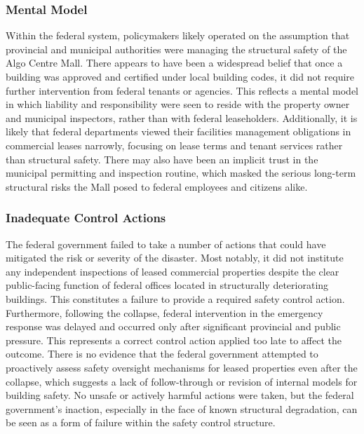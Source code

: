 \documentclass[12pt]{article}
\begin{document}
\subsubsection*{Mental Model}
Within the federal system, policymakers likely operated on the assumption that provincial and municipal authorities were managing the structural safety of the Algo Centre Mall. There appears to have been a widespread belief that once a building was approved and certified under local building codes, it did not require further intervention from federal tenants or agencies. This reflects a mental model in which liability and responsibility were seen to reside with the property owner and municipal inspectors, rather than with federal leaseholders. Additionally, it is likely that federal departments viewed their facilities management obligations in commercial leases narrowly, focusing on lease terms and tenant services rather than structural safety. There may also have been an implicit trust in the municipal permitting and inspection routine, which masked the serious long-term structural risks the Mall posed to federal employees and citizens alike.

\subsubsection*{Inadequate Control Actions}
The federal government failed to take a number of actions that could have mitigated the risk or severity of the disaster. Most notably, it did not institute any independent inspections of leased commercial properties despite the clear public-facing function of federal offices located in structurally deteriorating buildings. This constitutes a failure to provide a required safety control action. Furthermore, following the collapse, federal intervention in the emergency response was delayed and occurred only after significant provincial and public pressure. This represents a correct control action applied too late to affect the outcome. There is no evidence that the federal government attempted to proactively assess safety oversight mechanisms for leased properties even after the collapse, which suggests a lack of follow-through or revision of internal models for building safety. No unsafe or actively harmful actions were taken, but the federal government’s inaction, especially in the face of known structural degradation, can be seen as a form of failure within the safety control structure.
\end{document}

